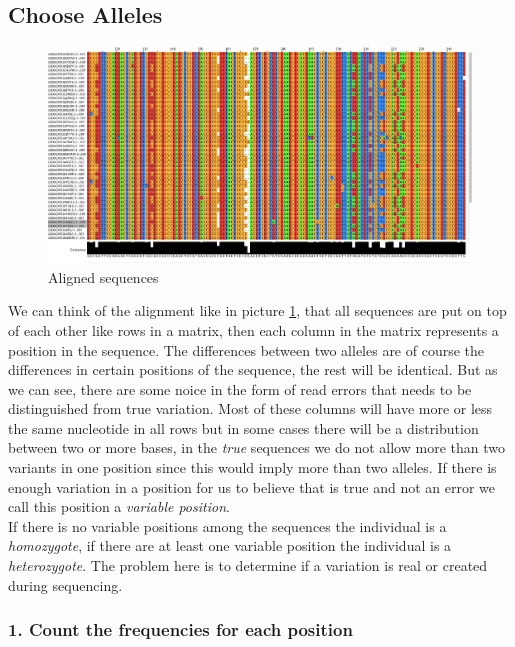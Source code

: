 \subsection{Choose Alleles}
\begin{figure}[ht]
	\centering
		\includegraphics[width=\textwidth]{../pictures/align_example.png}
	\caption{Aligned sequences}
	\label{fig:many_aligned_sequences}
\end{figure}


We can think of the alignment like in picture \ref{fig:many_aligned_sequences}, that all sequences are put on top of each other like rows in a matrix, then each column in the matrix represents a position in the sequence. The differences between two alleles are of course the differences in certain positions of the sequence, the rest will be identical. But as we can see, there are some noice in the form of read errors that needs to be distinguished from true variation. Most of these columns will have more or less the same nucleotide in all rows but in some cases there will be a distribution between two or more bases, in the \emph{true} sequences we do not allow more than two variants in one position since this would imply more than two alleles. If there is enough variation in a position for us to believe that is true and not an error we call this position a \emph{variable position}.\\

If there is no variable positions among the sequences the individual is a \emph{homozygote}, if there are at least one variable position the individual is a \emph{heterozygote}. The problem here is to determine if a variation is real or created during sequencing. 

\subsubsection{1. Count the frequencies for each position}


